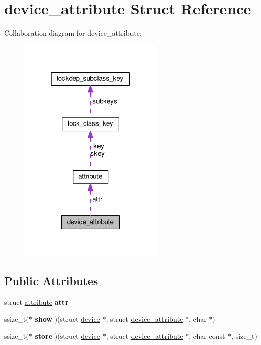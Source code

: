 \hypertarget{structdevice__attribute}{}\section{device\+\_\+attribute Struct Reference}
\label{structdevice__attribute}


Collaboration diagram for device\+\_\+attribute\+:
\nopagebreak
\begin{figure}[H]
\begin{center}
\leavevmode
\includegraphics[width=196pt]{structdevice__attribute__coll__graph}
\end{center}
\end{figure}
\subsection*{Public Attributes}
\begin{DoxyCompactItemize}
\item 
\hypertarget{structdevice__attribute_aac6191089794a6ef0b41d9580a712e9b}{}struct \hyperlink{structattribute}{attribute} {\bfseries attr}\label{structdevice__attribute_aac6191089794a6ef0b41d9580a712e9b}

\item 
\hypertarget{structdevice__attribute_a65c202617ad6c24c0627566c7a95c9d7}{}ssize\+\_\+t($\ast$ {\bfseries show} )(struct \hyperlink{structdevice}{device} $\ast$, struct \hyperlink{structdevice__attribute}{device\+\_\+attribute} $\ast$, char $\ast$)\label{structdevice__attribute_a65c202617ad6c24c0627566c7a95c9d7}

\item 
\hypertarget{structdevice__attribute_ab348133a8d51a1f79678828a970f6fcd}{}ssize\+\_\+t($\ast$ {\bfseries store} )(struct \hyperlink{structdevice}{device} $\ast$, struct \hyperlink{structdevice__attribute}{device\+\_\+attribute} $\ast$, char const $\ast$, size\+\_\+t)\label{structdevice__attribute_ab348133a8d51a1f79678828a970f6fcd}

\end{DoxyCompactItemize}


